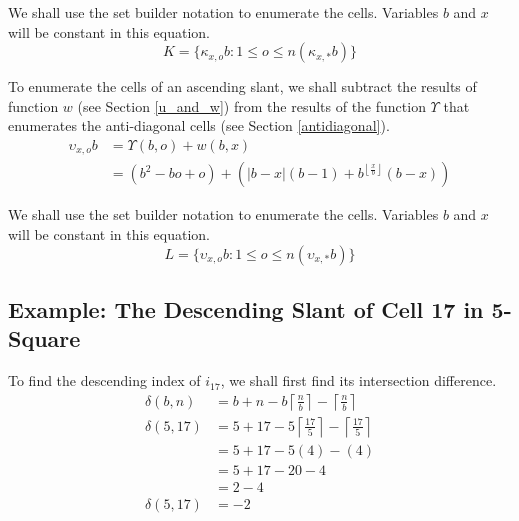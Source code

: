 \documentclass[letterpaper, twoside,12pt]{article}
\begin{document}
    We shall use the set builder notation to enumerate the cells. Variables $b$ and $x$ will be constant in this equation.
    \begin{equation}
        K = \{ \kappa_{x,o}b : 1 \leq o \leq n(\kappa_{x,*}b) \}
    \end{equation}

    To enumerate the cells of an ascending slant, we shall subtract the results of function $w$ (see Section \ref{u_and_w}) from the results of the function $\Upsilon$ that enumerates the anti-diagonal cells (see Section \ref{antidiagonal}).
    \begin{equation}
        \begin{split}
            \upsilon_{x,o}b &= \Upsilon(b,o) + w(b,x) \\
                &= (b^2 - bo + o) + (|b-x|(b-1)+ b^{\left\lfloor \frac{x}{b} \right\rfloor}(b-x))
        \end{split}
    \end{equation}

    We shall use the set builder notation to enumerate the cells. Variables $b$ and $x$ will be constant in this equation.
    \begin{equation}
        L = \{ \upsilon_{x,o}b : 1 \leq o \leq n(\upsilon_{x,*}b) \}
    \end{equation}

    \subsection{Example: The Descending Slant of Cell 17 in 5-Square} \label{3-4_example_1}
    To find the descending index of $i_{17}$, we shall first find its intersection difference.
    \begin{equation*}
        \begin{split}
            \delta(b,n) &= b + n - b\left\lceil \frac{n}{b} \right\rceil - \left\lceil \frac{n}{b} \right\rceil\\
            \delta(5,17) &= 5 + 17 - 5\left\lceil \frac{17}{5} \right\rceil - \left\lceil \frac{17}{5} \right\rceil\\
                &= 5 + 17 - 5(4) - (4)\\
                &= 5 + 17 - 20 - 4\\
                &= 2 - 4\\
            \delta(5,17) &= -2\\
        \end{split}
    \end{equation*}
\end{document}
